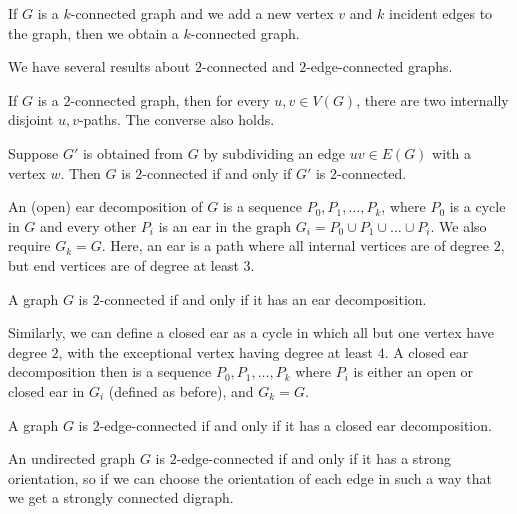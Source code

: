 \begin{theorem}
  If $G$ is a $k$-connected graph and we add a new vertex $v$ and $k$ incident
  edges to the graph, then we obtain a $k$-connected graph.
\end{theorem}

We have several results about $2$-connected and $2$-edge-connected graphs.

\begin{theorem}[Whitney]
  If $G$ is a $2$-connected graph, then for every $u, v \in V(G)$, there are two
  internally disjoint $u,v$-paths.
  The converse also holds.
\end{theorem}

\begin{proposition}
  Suppose $G'$ is obtained from $G$ by subdividing an edge $uv \in E(G)$ with a
  vertex $w$.
  Then $G$ is $2$-connected if and only if $G'$ is $2$-connected.
\end{proposition}

An (open) ear decomposition of $G$ is a sequence $P_0, P_1, \ldots, P_k$, where
$P_0$ is a cycle in $G$ and every other $P_i$ is an ear in the graph $G_i = P_0
\cup P_1 \cup \ldots \cup P_i$.
We also require $G_k = G$.
Here, an ear is a path where all internal vertices are of degree $2$, but end
vertices are of degree at least $3$.

\begin{theorem}
  A graph $G$ is $2$-connected if and only if it has an ear decomposition.
\end{theorem}

Similarly, we can define a closed ear as a cycle in which all but one vertex
have degree $2$, with the exceptional vertex having degree at least $4$.
A closed ear decomposition then is a sequence $P_0, P_1, \ldots, P_k$ where
$P_i$ is either an open or closed ear in $G_i$ (defined as before), and $G_k =
G$.

\begin{theorem}
  A graph $G$ is $2$-edge-connected if and only if it has a closed ear
  decomposition.
\end{theorem}

\begin{theorem}[Robbins]
  An undirected graph $G$ is $2$-edge-connected if and only if it has a strong
  orientation, so if we can choose the orientation of each edge in such a way
  that we get a strongly connected digraph.
\end{theorem}

